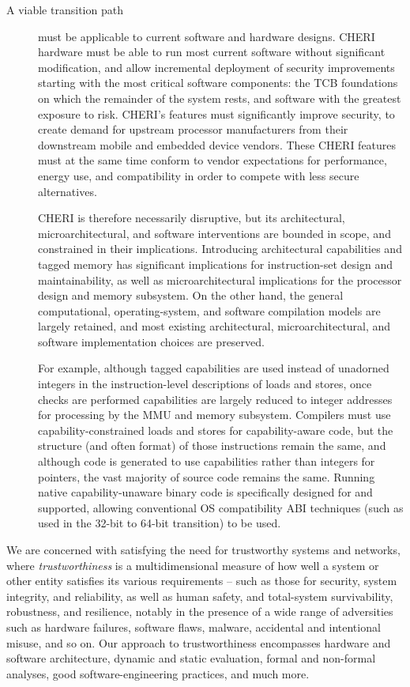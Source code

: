 \begin{description}
\item[A viable transition path] must be applicable to current software and
hardware designs.
CHERI hardware must be able to run most current software without significant
modification, and allow incremental deployment of security
improvements starting with the most critical software components: the TCB
foundations on which the remainder of the system rests, and software with the
greatest exposure to risk.
CHERI's features must significantly improve security, to create demand for
upstream processor manufacturers from their downstream mobile and embedded
device vendors.
These CHERI features must at the same time conform to vendor expectations
for performance, energy use, and compatibility in order to compete with less
secure alternatives.

CHERI is therefore necessarily disruptive, but its architectural,
microarchitectural, and software interventions are bounded in scope, and
constrained in their implications.
Introducing architectural capabilities and tagged memory has significant
implications for instruction-set design and maintainability, as well as
microarchitectural implications for the processor design and memory subsystem.
On the other hand, the general computational, operating-system, and software
compilation models are largely retained, and most existing architectural,
microarchitectural, and software implementation choices are preserved.

For example, although tagged capabilities are used instead of unadorned
integers in the instruction-level descriptions of loads and stores, once
checks are performed capabilities are largely reduced to integer addresses
for processing by the MMU and memory subsystem.
Compilers must use capability-constrained loads and stores for capability-aware
code, but the structure (and often format) of those instructions remain the
same, and although code is generated to use capabilities rather than integers
for pointers, the vast majority of source code remains the same.
Running native capability-unaware binary code is specifically designed for and
supported, allowing conventional OS compatibility ABI techniques (such as used
in the 32-bit to 64-bit transition) to be used.

\end{description}

We are concerned with satisfying the need for
trustworthy systems and networks, where {\it
trustworthiness} is a multidimensional measure of how well a system or
other entity satisfies its various requirements -- such as those for
security, system integrity, and reliability, as well as human safety,
and total-system survivability,
robustness, and resilience, notably in the presence of a wide range of
adversities such as hardware failures, software flaws, malware,
accidental and intentional misuse, and so on.  Our approach to
trustworthiness encompasses hardware and software architecture,
dynamic and static evaluation, formal and non-formal analyses, good
software-engineering practices, and much more.

